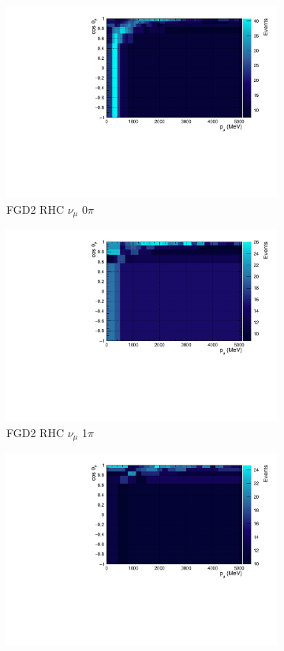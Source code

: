 \begin{figure}
\begin{subfigure}{.32\textwidth}
  \includegraphics[width=0.95\linewidth]{figs/TH2PolyNom_MC_FGD2_NuMuBkg_CC0pi_in_AntiNu_Mode}
  \caption{FGD2 RHC $\nu_{\mu}$ 0$\pi$}
  \label{fig:th2polynomFGD2_NuMuBkg_CC0pi_in_AntiNu_Mode}
\end{subfigure}
\begin{subfigure}{.32\textwidth}
  \centering
  \includegraphics[width=0.95\linewidth]{figs/TH2PolyNom_MC_FGD2_NuMuBkg_CC1pi_in_AntiNu_Mode}
  \caption{FGD2 RHC $\nu_{\mu}$ 1$\pi$}
  \label{fig:th2polynomFGD2_NuMuBkg_CC1pi_in_AntiNu_Mode}
\end{subfigure}
\begin{subfigure}{.32\textwidth}
  \centering
  \includegraphics[width=0.95\linewidth]{figs/TH2PolyNom_MC_FGD2_NuMuBkg_CCOther_in_AntiNu_Mode}

\end{subfigure}
\end{figure}

